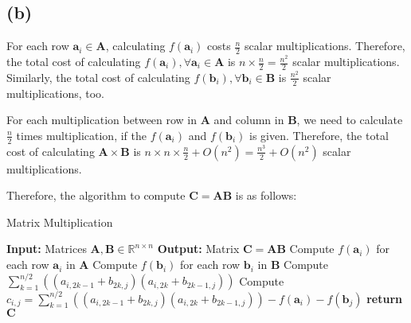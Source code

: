 \documentclass{article}
\newcommand{\R}{\mathbb{R}}
\begin{document}
\subsection*{(b)}
\noindent
For each row \(\bm{a}_i \in \bm{A}\), calculating \(f(\bm{a}_i)\) costs \(\frac{n}{2}\) scalar multiplications. Therefore, the total cost of calculating \(f(\bm{a}_i), \forall \bm{a}_i \in \bm{A}\) is \(n \times \frac{n}{2} = \frac{n^2}{2}\) scalar multiplications. Similarly, the total cost of calculating \(f(\bm{b}_i),  \forall \bm{b}_i \in \bm{B}\) is \(\frac{n^2}{2}\) scalar multiplications, too.

\noindent
For each multiplication between row in \(\bm{A}\) and column in \(\bm{B}\), we need to calculate \(\frac{n}{2}\) times multiplication, if the \(f(\bm{a}_i)\) and \( f(\bm{b}_i)\) is given. Therefore, the total cost of calculating \(\bm{A} \times \bm{B}\) is \(n \times n \times \frac{n}{2} + O(n^2) = \frac{n^3}{2} + O(n^2)\) scalar multiplications.

\noindent
Therefore, the algorithm to compute \(\bm{C} = \bm{A}\bm{B}\) is as follows:

\noindent
\begin{algorithm}
    \caption{Matrix Multiplication}
    \begin{algorithmic}[1]
        \State \textbf{Input:} Matrices \(\bm{A}, \bm{B} \in \R^{n \times n}\)
        \State \textbf{Output:} Matrix \(\bm{C} = \bm{A} \bm{B}\)
        \State Compute \(f(\bm{a}_i)\) for each row \(\bm{a}_i\) in \(\bm{A}\)
        \State Compute \(f(\bm{b}_i)\) for each row \(\bm{b}_i\) in \(\bm{B}\)
                \State Compute \(\sum_{k = 1}^{n / 2}((a_{i, 2k - 1} + b_{2k, j})(a_{i, 2k} + b_{2k - 1, j}))\)
                \State Compute \(c_{i, j} = \sum_{k = 1}^{n / 2}((a_{i, 2k - 1} + b_{2k, j})(a_{i, 2k} + b_{2k - 1, j})) - f(\bm{a}_i) - f(\bm{b}_j)\)
            \EndFor
        \EndFor
        \State \textbf{return} \(\bm{C}\)
    \end{algorithmic}
\end{algorithm}
\end{document}
